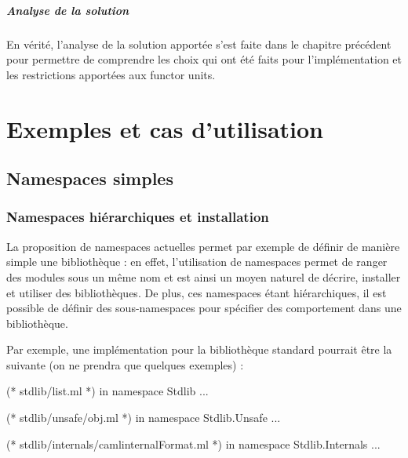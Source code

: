 \documentclass[11pt,a4paper]{report}
\begin{document}
\paragraph{Analyse de la solution}

En vérité, l'analyse de la solution apportée s'est faite dans le chapitre
précédent pour permettre de comprendre les choix qui ont été faits pour
l'implémentation et les restrictions apportées aux functor units.

\chapter{Exemples et cas d'utilisation}

\section{Namespaces simples}

\subsection{Namespaces hiérarchiques et installation}

La proposition de namespaces actuelles permet par exemple de définir de manière
simple une bibliothèque : en effet, l'utilisation de namespaces permet de ranger
des modules sous un même nom et est ainsi un moyen naturel de décrire, installer
et utiliser des bibliothèques. De plus, ces namespaces étant hiérarchiques, il
est possible de définir des sous-namespaces pour spécifier des comportement dans
une bibliothèque.

Par exemple, une implémentation pour la bibliothèque standard pourrait être la
suivante (on ne prendra que quelques exemples) :
\begin{OCaml}
(* stdlib/list.ml *)
in namespace Stdlib
...
\end{OCaml}

\begin{OCaml}
(* stdlib/unsafe/obj.ml *)
in namespace Stdlib.Unsafe
...
\end{OCaml}

\begin{OCaml}
(* stdlib/internals/camlinternalFormat.ml *)
in namespace Stdlib.Internals
...
\end{OCaml}
\end{document}
